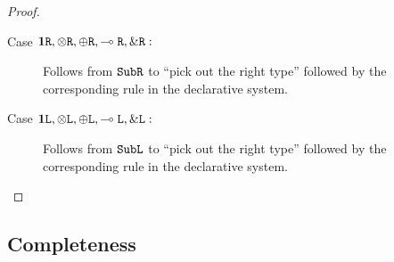 \begin{proof}
\begin{description}
    \item[Case $\mathbf{1}\texttt{R}, \otimes\texttt{R}, \oplus\texttt{R}, \multimap\texttt{R}, \&\texttt{R} :$] Follows from $\texttt{Sub}\texttt{R}$ to ``pick out the right type'' followed by the corresponding rule in the declarative system.
    \item[Case $\mathbf{1}\texttt{L}, \otimes\texttt{L}, \oplus\texttt{L}, \multimap\texttt{L}, \&\texttt{L} :$] Follows from $\texttt{Sub}\texttt{L}$ to ``pick out the right type'' followed by the corresponding rule in the declarative system.
  \end{description}
\end{proof}


\subsection{Completeness}

